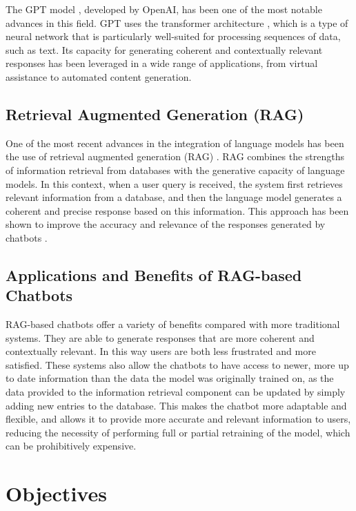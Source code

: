 \documentclass[a4paper,12pt,twoside]{ThesisStyle}
\begin{document}
The GPT model \cite{Radford2018ImprovingLU}, developed by OpenAI, has been one of the most notable advances in this field. GPT uses the transformer architecture \cite{Vaswani2023AttentionNeed}, which is a type of neural network that is particularly well-suited for processing sequences of data, such as text. Its capacity for generating coherent and contextually relevant responses has been leveraged in a wide range of applications, from virtual assistance to automated content generation.

\subsection{Retrieval Augmented Generation (RAG)}
\label{subsec:rag}

One of the most recent advances in the integration of language models has been the use of retrieval augmented generation (RAG) \cite{Lewis2021RetrievalAugmentedGeneration}. RAG combines the strengths of information retrieval from databases with the generative capacity of language models. In this context, when a user query is received, the system first retrieves relevant information from a database, and then the language model generates a coherent and precise response based on this information. This approach has been shown to improve the accuracy and relevance of the responses generated by chatbots \cite{Lewis2021RetrievalAugmentedGeneration}.

\subsection{Applications and Benefits of RAG-based Chatbots}
\label{subsec:applications}

RAG-based chatbots offer a variety of benefits compared with more traditional systems. They are able to generate responses that are more coherent and contextually relevant. In this way users are both less frustrated and more satisfied. These systems also allow the chatbots to have access to newer, more up to date information than the data the model was originally trained on, as the data provided to the information retrieval component can be updated by simply adding new entries to the database. This makes the chatbot more adaptable and flexible, and allows it to provide more accurate and relevant information to users, reducing the necessity of performing full or partial retraining of the model, which can be prohibitively expensive.

\section{Objectives}
\end{document}
